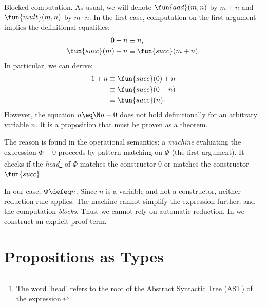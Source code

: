\begin{lpar}{Blocked computation.}\label{lpar:blocked-computation}
    As usual, we will denote $\fun{add}(m,n)$ by $m+n$ and $\fun{mult}(m,n)$ by $m\cdot n$. In the first case, computation on the first argument implies the definitional equalities:
    \begin{equation}\label{eq:0+n-equiv-n}
        \begin{aligned}
            0+n &\equiv n,\\
            \fun{succ}(m)+n &\equiv \fun{succ}(m+n).
        \end{aligned}
    \end{equation}
    In particular, we can derive:
    \begin{align*}
        1+n &\equiv \fun{succ}(0)+n\\
            &\equiv \fun{succ}(0+n)\\
            &\equiv \fun{succ}(n).
    \end{align*}
    However, the equation $n \eq\N n+0$ does not hold definitionally for an arbitrary variable $n$. It is a proposition that must be proven as a theorem.

    The reason is found in the operational semantics: a \textit{machine} evaluating the expression $\Phi+0$ proceeds by pattern matching on $\Phi$ (the first argument). It checks if the \textit{head}\footnote{The word 'head' refers to the root of the Abstract Syntactic Tree (AST) of the expression.} of $\Phi$ matches the constructor $0$ or matches the constructor $\fun{succ}$.

    In our case, $\Phi\defeq n$. Since $n$ is a variable and not a constructor, neither reduction rule applies. The machine cannot simplify the expression further, and the computation \textit{blocks}. Thus, we cannot rely on automatic reduction. In  we construct an explicit proof term.
\end{lpar}


\section{Propositions as Types}

